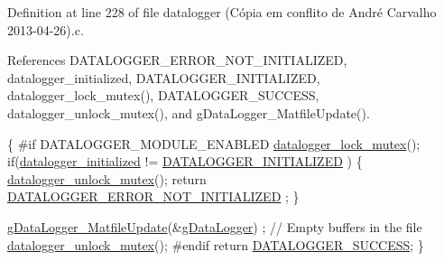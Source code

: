 Definition at line 228 of file datalogger (\-Cópia em conflito de André Carvalho 2013-\/04-\/26).\-c.



References D\-A\-T\-A\-L\-O\-G\-G\-E\-R\-\_\-\-E\-R\-R\-O\-R\-\_\-\-N\-O\-T\-\_\-\-I\-N\-I\-T\-I\-A\-L\-I\-Z\-E\-D, datalogger\-\_\-initialized, D\-A\-T\-A\-L\-O\-G\-G\-E\-R\-\_\-\-I\-N\-I\-T\-I\-A\-L\-I\-Z\-E\-D, datalogger\-\_\-lock\-\_\-mutex(), D\-A\-T\-A\-L\-O\-G\-G\-E\-R\-\_\-\-S\-U\-C\-C\-E\-S\-S, datalogger\-\_\-unlock\-\_\-mutex(), and g\-Data\-Logger\-\_\-\-Matfile\-Update().


\begin{DoxyCode}
\{
\textcolor{preprocessor}{    #if DATALOGGER\_MODULE\_ENABLED}
\textcolor{preprocessor}{}    \hyperlink{datalogger_01_07Caio-PC's_01conflicted_01copy_012012-11-23_08_8c_a54b06d9395b2e370a5a72beb7f9524b2}{datalogger\_lock\_mutex}();
    \textcolor{keywordflow}{if}(\hyperlink{datalogger_01_07Caio-PC's_01conflicted_01copy_012012-11-23_08_8c_a35e8fbe04b90452afdc3c1be16ff6187}{datalogger\_initialized} != \hyperlink{datalogger_01_07Caio-PC's_01conflicted_01copy_012012-11-23_08_8h_a684c343d340004b77ca2b782934c96ca}{DATALOGGER\_INITIALIZED}
      )
    \{
        \hyperlink{datalogger_01_07Caio-PC's_01conflicted_01copy_012012-11-23_08_8c_a85453211c0c809083c36cc56b275aeeb}{datalogger\_unlock\_mutex}();
        \textcolor{keywordflow}{return} \hyperlink{datalogger_01_07Caio-PC's_01conflicted_01copy_012012-11-23_08_8h_a60df7fe0e61b757ad6a9db106b0eb43e}{DATALOGGER\_ERROR\_NOT\_INITIALIZED}
      ;
    \}

    \hyperlink{gdatalogger_8c_a05dc8ce832b941280d7de26057992640}{gDataLogger\_MatfileUpdate}(&\hyperlink{datalogger_01_07Caio-PC's_01conflicted_01copy_012012-11-23_08_8c_abe3b9c2c4e21e79c7b046b5986d13acc}{gDataLogger})
      ; \textcolor{comment}{// Empty buffers in the file}
    \hyperlink{datalogger_01_07Caio-PC's_01conflicted_01copy_012012-11-23_08_8c_a85453211c0c809083c36cc56b275aeeb}{datalogger\_unlock\_mutex}();
\textcolor{preprocessor}{    #endif}
\textcolor{preprocessor}{}
    \textcolor{keywordflow}{return} \hyperlink{datalogger_01_07Caio-PC's_01conflicted_01copy_012012-11-23_08_8h_abddebaf71d26d40183fccbb1a766b983}{DATALOGGER\_SUCCESS};
\}
\end{DoxyCode}



